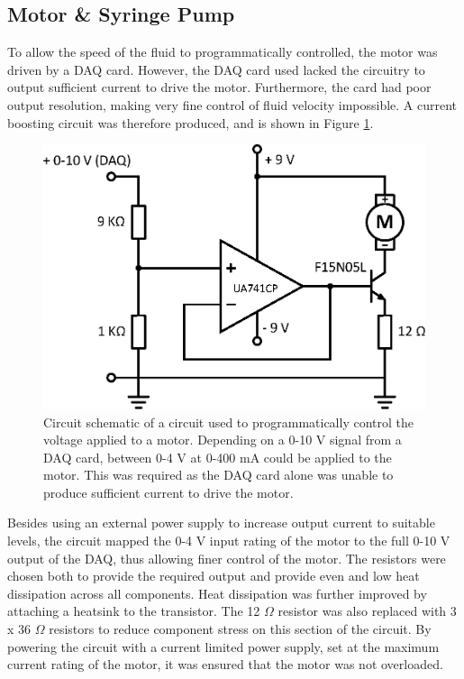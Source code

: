 \documentclass{physics_article_B}
\begin{document}
    \subsection{Motor \& Syringe Pump\label{sect:method:motor}}

        To allow the speed of the fluid to programmatically controlled, the motor was driven by a DAQ card. However, the DAQ card used lacked the circuitry to output sufficient current to drive the motor. Furthermore, the card had poor output resolution, making very fine control of fluid velocity impossible. A current boosting circuit was therefore produced, and is shown in Figure \ref{fig:MotorCircuit}.  
        
            \begin{figure}[H]
                \centering
                \hspace*{-1.8cm}\includegraphics[scale=0.8]{Figures/MotorCircuit.eps}
                \caption{Circuit schematic of a circuit used to programmatically control the voltage applied to a motor. Depending on a 0-10 V signal from a DAQ card, between 0-4 V at 0-400 mA could be applied to the motor. This was required as the DAQ card alone was unable to produce sufficient current to drive the motor.}
                \label{fig:MotorCircuit}
            \end{figure}
        
        Besides using an external power supply to increase output current to suitable levels, the circuit mapped the 0-4 V input rating of the motor to the full 0-10 V output of the DAQ, thus allowing finer control of the motor. The resistors were chosen both to provide the required output and provide even and low heat dissipation across all components. Heat dissipation was further improved by attaching a heatsink to the transistor. The 12 $\Omega$ resistor was also replaced with 3 x 36 $\Omega$ resistors to reduce component stress on this section of the circuit. By powering the circuit with a current limited power supply, set at the maximum current rating of the motor, it was ensured that the motor was not overloaded. 
        
\end{document}
